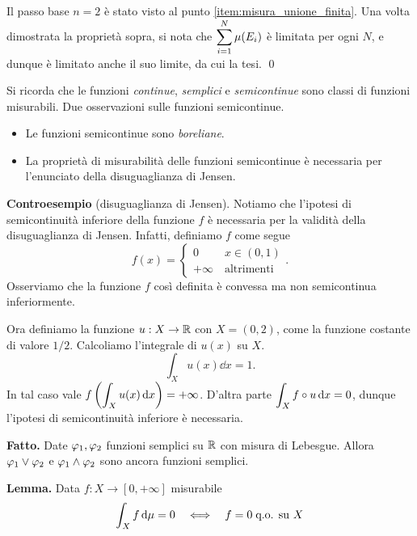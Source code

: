 Il passo base $n = 2$ è stato visto al punto \ref{item:misura_unione_finita}. Una volta dimostrata la proprietà sopra, si nota che $\displaystyle \sum_{i=1}^{N} \mu(E_i) $ è limitata per ogni $N$, e dunque è limitato anche il suo limite, da cui la tesi.
\qed


Si ricorda che le funzioni \textit{continue}, \textit{semplici} e \textit{semicontinue} sono classi di funzioni misurabili.
Due osservazioni sulle funzioni semicontinue.
\begin{itemize}
\item Le funzioni semicontinue sono \textit{boreliane}.

\item La proprietà di misurabilità delle funzioni semicontinue è necessaria per l'enunciato della disuguaglianza di Jensen.
\end{itemize}

\textbf{Controesempio} (disuguaglianza di Jensen).
Notiamo che l'ipotesi di semicontinuità inferiore della funzione $f$ è necessaria per la validità della disuguaglianza di Jensen.
Infatti, definiamo $f$ come segue
%
$$
f(x) = 
\begin{cases}
0 \qquad \; x \in (0,1) \\
+ \infty \quad \text{altrimenti} 
\end{cases}.
$$
%
Osserviamo che la funzione $f$ così definita è convessa ma non semicontinua inferiormente.

Ora definiamo la funzione $u : X \to \mathbb R$ con $X = (0,2)$, come la funzione costante di valore $1/2$.
Calcoliamo l'integrale di $u(x)$ su $X$.
%
$$
	\int_{X} u(x) \dd x = 1. 
$$
%
In tal caso vale $\displaystyle f \left( \int_X u(x) \,\mathrm{d} x \right) = + \infty$.
D'altra parte $\displaystyle \int_X f \circ u \,\mathrm{d} x = 0$, dunque l'ipotesi di semicontinuità inferiore è necessaria.

\textbf{Fatto.}
Date $\varphi_1, \varphi_2$ funzioni semplici su $\mathbb R$ con misura di Lebesgue.
Allora $\varphi_1 \vee \varphi_2$ e $\varphi_1 \wedge \varphi_2$ sono ancora funzioni semplici.

\textbf{Lemma.}
Data $f \colon X \to [0, +\infty]$ misurabile
$$
\int_X f \,\mathrm{d} \mu = 0 \quad \Longleftrightarrow \quad f = 0 \; \text{q.o. su } X
$$

